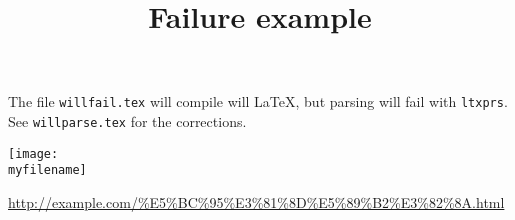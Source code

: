 \documentclass[french]{article}
\newcommand{\myfilename}{"$HOME/toto.png"}
\newcommand{\myurl}{\url{http://example.com/\%E5\%BC\%95\%E3\%81\%8D\%E5\%89\%B2\%E3\%82\%8A.html}}
\begin{document}
\title{Failure example}
The file \texttt{willfail.tex} will compile will \LaTeX, but parsing will fail with \texttt{ltxprs}.
See \texttt{willparse.tex} for the corrections. 



\texttt{[image: \\myfilename]}

\myurl

\end{document}
